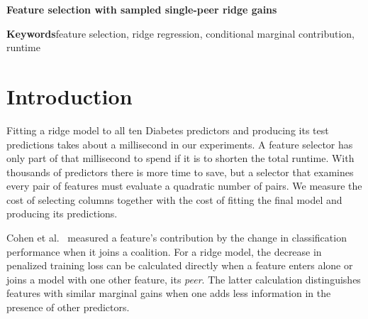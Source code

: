 \documentclass[11pt,a4paper]{article}
\newcommand{\papertitle}{Feature selection with sampled single-peer ridge gains}
\begin{document}
\begin{center}
\parbox{.78\linewidth}{\centering\LARGE\bfseries \papertitle\par}
\end{center}
\begin{abstract}
A feature that predicts a response on its own may add little once another feature enters the model. We rank each feature by the smaller of its ridge gain in isolation and its mean gain when added to one other feature. Above 32 input columns, we estimate the mean using eight randomly sampled peers and discount weak gains when choosing how many columns to keep. We evaluated the rule on 405 classification and regression configurations with 4 to 54\,877 columns. It removed columns in 403 configurations and shortened the total time for selection, fitting and prediction in 320. In 215 of these, the test score was within 0.02 of the full-feature score or better. The same criteria held in 163 configurations for exhaustive single-peer selection, 131 for a width-matched F filter and 152 for width-matched random selection. At matched width, the sampled rule scored higher than random selection in 286 configurations. Its median paired total-time ratio to random selection was 1.11. On the 115 regression configurations with more than 32 columns, the median loss in test $R^2$ relative to the full model was 0.008, but the 90th percentile was 0.513.
\end{abstract}
\noindent\textbf{Keywords}\quad feature selection, ridge regression, conditional marginal contribution, runtime

\section{Introduction}
Fitting a ridge model to all ten Diabetes predictors and producing its test predictions takes about a millisecond in our experiments. A feature selector has only part of that millisecond to spend if it is to shorten the total runtime. With thousands of predictors there is more time to save, but a selector that examines every pair of features must evaluate a quadratic number of pairs. We measure the cost of selecting columns together with the cost of fitting the final model and producing its predictions.

Cohen et al.~\cite{cohen} measured a feature's contribution by the change in classification performance when it joins a coalition. For a ridge model, the decrease in penalized training loss can be calculated directly when a feature enters alone or joins a model with one other feature, its \emph{peer}. The latter calculation distinguishes features with similar marginal gains when one adds less information in the presence of other predictors.
\end{document}
